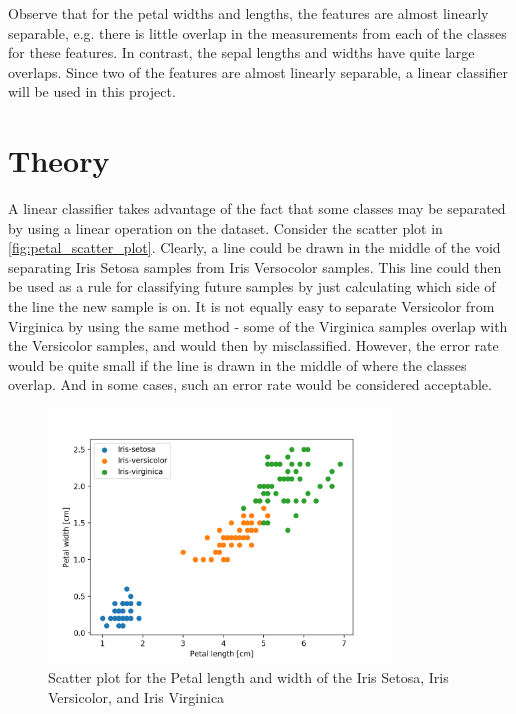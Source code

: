 \documentclass{article}
\begin{document}
Observe that for the petal widths and lengths, the features are almost linearly separable, e.g.
there is little overlap in the measurements from each of the classes for these features. In contrast,
the sepal lengths and widths have quite large overlaps. Since two of the features are almost
linearly separable, a linear classifier will be used in this project.

\section{Theory}\label{sec:theory}

A linear classifier takes advantage of the fact that some classes may be separated by using a
linear operation on the dataset. Consider the scatter plot in \autoref{fig:petal_scatter_plot}.
Clearly, a line could be drawn in the middle of the void separating Iris Setosa samples from
Iris Versocolor samples. This line could then be used as a rule for classifying future samples
by just calculating which side of the line the new sample is on. It is not equally easy to
separate Versicolor from Virginica by using the same method - some of the Virginica samples overlap
with the Versicolor samples, and would then by misclassified. However, the error rate would be
quite small if the line is drawn in the middle of where the classes overlap. And in some cases,
such an error rate would be considered acceptable.

\begin{figure}
    \centering
    \includegraphics[width=0.8\textwidth]{../images/petal_scatter.png}
    \caption{Scatter plot for the Petal length and width of the Iris Setosa, Iris Versicolor,
    and Iris Virginica}
    \label{fig:petal_scatter_plot}
\end{figure}
\end{document}
